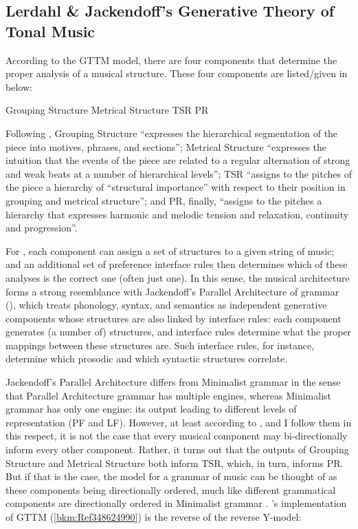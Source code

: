 \documentclass[output=paper]{langsci/langscibook}
\begin{document}
\subsection{Lerdahl \& Jackendoff’s Generative Theory of Tonal Music}
\label{sec:key:26.3.1}

According to the \gls{GTTM} model, there
are four components that determine the proper analysis of a musical structure.
These four components are listed/given in  below:

\ea\label{ex:key:26.4}
    \ea Grouping Structure
    \ex Metrical Structure
    \ex \gls{TSR}
    \ex \gls{PR}
    \z
\z

Following \textcite[8--9]{LerJac1983}, Grouping Structure “expresses the
hierarchical segmentation of the piece into motives, phrases, and sections”;
Metrical Structure “expresses the intuition that the events of the piece are
related to a regular alternation of strong and weak beats at a number of
hierarchical levels”; \gls{TSR} “assigns to the pitches of the piece a
hierarchy of \enquote{structural importance} with respect to their position in
grouping and metrical structure”; and \gls{PR}, finally, “assigns to the
pitches a hierarchy that expresses harmonic and melodic tension and relaxation,
continuity and progression”.

For \citet{LerJac1983}, each component can assign a set of structures to a
given string of music; and an additional set of preference interface rules then
determines which of these analyses is the correct one (often just one). In this
sense, the musical architecture forms a strong resemblance with Jackendoff’s
Parallel Architecture of grammar
(\citealt{Jackendoff1997,Jackendoff2002,CulJac2005}), which treats phonology,
syntax, and semantics as independent generative components whose structures are
also linked by interface rules: each component generates (a number of)
structures, and interface rules determine what the proper mappings between
these structures are. Such interface rules, for instance, determine which
prosodic and which syntactic structures correlate.

Jackendoff’s Parallel Architecture differs from Minimalist grammar in the sense
that Parallel Architecture grammar has multiple engines, whereas Minimalist
grammar has only one engine: its output leading to different levels of
representation (\gls{PF} and \gls{LF}). However, at least according to
\citeauthor{KatzPes2011}, and I follow them in this respect, it is not the case
that every musical component may bi-directionally inform every other component.
Rather, it turns out that the outputs of Grouping Structure and Metrical
Structure both inform \gls{TSR}, which, in turn, informs \gls{PR}. But if that
is the case, the model for a grammar of music can be thought of as these
components being directionally ordered, much like different grammatical
components are directionally ordered in Minimalist grammar .
\citeauthor{KatzPes2011}’s implementation of GTTM (\ref{bkm:Ref348624990}) is
the reverse of the reverse Y-model:
\end{document}
